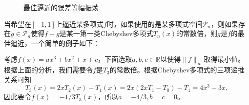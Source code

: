\documentclass[a4paper,10pt]{ctexart}
\begin{document}
\begin{figure}[htpb]
    \centering
    \caption{最佳逼近的误差等幅振荡}
    \label{fig:besterror}
\end{figure}

当希望在$ [-1,1] $上逼近某多项式$ f $时，如果使用的是某多项式空间$ \mathcal{P}_n $，则如果存在$ g\in \mathcal{P}_n $使得$ f-g $是某一第一类Chebyshev多项式$ T_n(x) $的常数倍，则$ g $是$ f $的最佳逼近，一个简单的例子如下：
\begin{example}
    考虑$ f(x) = ax^3+bx^2+x+c $，下面选取$ a,b,c\in \mathbb{R} $以使得$ \| f \|_\infty $取得最小值。根据上面的分析，我们需要令$ f $是$ T_3 $的常数倍。根据Chebyshev多项式的三项递推关系可知
    \[
        T_3(x) = 2x T_2(x) - T_1(x) = 2x (2xT_1-T_0) - T_1 = 4x^3 -3x,
    \]
    因此要令$ f(x) = -1 / 3 T_3(x) $，所以$ a=-4/3,b=c=0 $。
\end{example}
\end{document}
